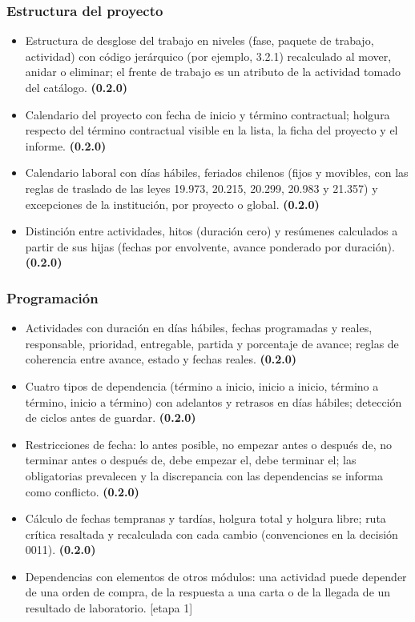 \documentclass[11pt,a4paper]{article}
\newcommand{\etapa}[1]{\textcolor{grismedio}{[etapa #1]}}
\begin{document}
\subsubsection{Estructura del proyecto}
\begin{itemize}
\item Estructura de desglose del trabajo en niveles (fase, paquete de trabajo, actividad) con código jerárquico (por ejemplo, 3.2.1) recalculado al mover, anidar o eliminar; el frente de trabajo es un atributo de la actividad tomado del catálogo. \textbf{(0.2.0)}
\item Calendario del proyecto con fecha de inicio y término contractual; holgura respecto del término contractual visible en la lista, la ficha del proyecto y el informe. \textbf{(0.2.0)}
\item Calendario laboral con días hábiles, feriados chilenos (fijos y movibles, con las reglas de traslado de las leyes 19.973, 20.215, 20.299, 20.983 y 21.357) y excepciones de la institución, por proyecto o global. \textbf{(0.2.0)}
\item Distinción entre actividades, hitos (duración cero) y resúmenes calculados a partir de sus hijas (fechas por envolvente, avance ponderado por duración). \textbf{(0.2.0)}
\end{itemize}

\subsubsection{Programación}
\begin{itemize}
\item Actividades con duración en días hábiles, fechas programadas y reales, responsable, prioridad, entregable, partida y porcentaje de avance; reglas de coherencia entre avance, estado y fechas reales. \textbf{(0.2.0)}
\item Cuatro tipos de dependencia (término a inicio, inicio a inicio, término a término, inicio a término) con adelantos y retrasos en días hábiles; detección de ciclos antes de guardar. \textbf{(0.2.0)}
\item Restricciones de fecha: lo antes posible, no empezar antes o después de, no terminar antes o después de, debe empezar el, debe terminar el; las obligatorias prevalecen y la discrepancia con las dependencias se informa como conflicto. \textbf{(0.2.0)}
\item Cálculo de fechas tempranas y tardías, holgura total y holgura libre; ruta crítica resaltada y recalculada con cada cambio (convenciones en la decisión 0011). \textbf{(0.2.0)}
\item Dependencias con elementos de otros módulos: una actividad puede depender de una orden de compra, de la respuesta a una carta o de la llegada de un resultado de laboratorio. \etapa{1}
\end{itemize}
\end{document}
